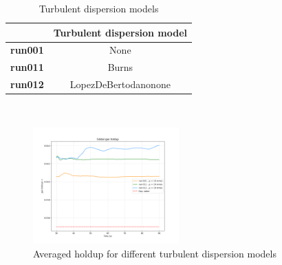 \documentclass[11pt,a4paper]{article}
\begin{document}
\begin{table}[H]
    \centering 
    \begin{tabular}{|p{8em} c |}
    \hline
    \rowcolor{bluePoli!40}
    & \textbf{Turbulent dispersion model} \T\B \\
    \hline \hline
    \textbf{run001} & None \T\B \\
    \textbf{run011} & Burns \T\B \\
    \textbf{run012} & LopezDeBertodanonone \T\B \\
    \hline
    \end{tabular}
    \\[10pt]
    \caption{Turbulent dispersion models}
    \label{table:turbulent_dispersion_models}
\end{table}

\begin{figure}[H]
    \centering
    \includegraphics[width=0.5\textwidth]{Images/graphs/turbdisp/holdUp10.png}
    \caption{Averaged holdup for different turbulent dispersion models}
    \label{fig:holdup_turbdisp}
\end{figure}
\end{document}
